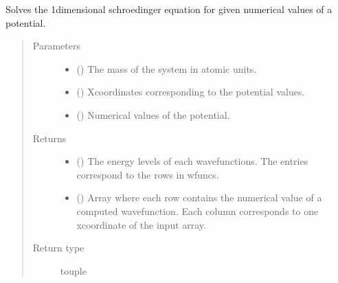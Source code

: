\documentclass[letterpaper,12,english]{sphinxmanual}
\begin{document}

\begin{fulllineitems}
\label{\detokenize{api:solvers.schroedinger}}
Solves the 1\sphinxhyphen{}dimensional schroedinger equation for given numerical
values of a potential.
\begin{quote}\begin{description}
\item[{Parameters}] \leavevmode\begin{itemize}
\item {} 
 () \textendash{} The mass of the system in atomic units.

\item {} 
 () \textendash{} X\sphinxhyphen{}coordinates corresponding to the potential
values.

\item {} 
 () \textendash{} Numerical values of the potential.

\end{itemize}

\item[{Returns}] \leavevmode

\begin{itemize}
\item {} 
 () \sphinxhyphen{} The energy levels of each wavefunctions.
The entries correspond to the rows in wfuncs.

\item {} 
 () \sphinxhyphen{} Array where each row contains the numerical
value of a computed wavefunction. Each column corresponds to one
x\sphinxhyphen{}coordinate of the input array.

\end{itemize}


\item[{Return type}] \leavevmode
touple

\end{description}\end{quote}

\end{fulllineitems}
\end{document}
